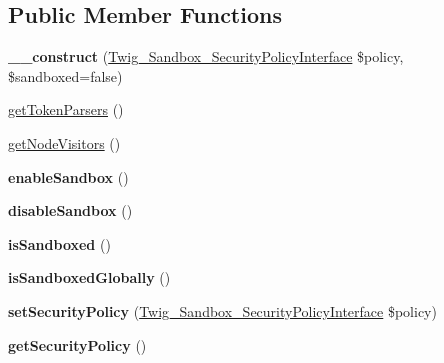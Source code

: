 \subsection*{Public Member Functions}
\begin{DoxyCompactItemize}
\item 
{\bfseries \+\_\+\+\_\+construct} (\hyperlink{interfaceTwig__Sandbox__SecurityPolicyInterface}{Twig\+\_\+\+Sandbox\+\_\+\+Security\+Policy\+Interface} \$policy, \$sandboxed=false)\hypertarget{classTwig__Extension__Sandbox_a1d6211e06da525fd32d15f4f6ebf4332}{}\label{classTwig__Extension__Sandbox_a1d6211e06da525fd32d15f4f6ebf4332}

\item 
\hyperlink{classTwig__Extension__Sandbox_a8c88c3bd42cdc91bc8b1d691d7bf1a54}{get\+Token\+Parsers} ()
\item 
\hyperlink{classTwig__Extension__Sandbox_a5a5bd7d2f5213a4fb2a5c3eff2080df3}{get\+Node\+Visitors} ()
\item 
{\bfseries enable\+Sandbox} ()\hypertarget{classTwig__Extension__Sandbox_adb510b6224d02391c2d7901dc5b4f796}{}\label{classTwig__Extension__Sandbox_adb510b6224d02391c2d7901dc5b4f796}

\item 
{\bfseries disable\+Sandbox} ()\hypertarget{classTwig__Extension__Sandbox_a91c7c15bf1787733b2fec066ef2510ea}{}\label{classTwig__Extension__Sandbox_a91c7c15bf1787733b2fec066ef2510ea}

\item 
{\bfseries is\+Sandboxed} ()\hypertarget{classTwig__Extension__Sandbox_a87afab0d0d98af4443a22d2b25eb27ef}{}\label{classTwig__Extension__Sandbox_a87afab0d0d98af4443a22d2b25eb27ef}

\item 
{\bfseries is\+Sandboxed\+Globally} ()\hypertarget{classTwig__Extension__Sandbox_ad615bd0ebe0b22edf93702648125272a}{}\label{classTwig__Extension__Sandbox_ad615bd0ebe0b22edf93702648125272a}

\item 
{\bfseries set\+Security\+Policy} (\hyperlink{interfaceTwig__Sandbox__SecurityPolicyInterface}{Twig\+\_\+\+Sandbox\+\_\+\+Security\+Policy\+Interface} \$policy)\hypertarget{classTwig__Extension__Sandbox_a7769a210fafb94f349acdaed41006ebd}{}\label{classTwig__Extension__Sandbox_a7769a210fafb94f349acdaed41006ebd}

\item 
{\bfseries get\+Security\+Policy} ()\hypertarget{classTwig__Extension__Sandbox_add807096755e70d7e5082b9660fa3918}{}\label{classTwig__Extension__Sandbox_add807096755e70d7e5082b9660fa3918}


\end{DoxyCompactItemize}
